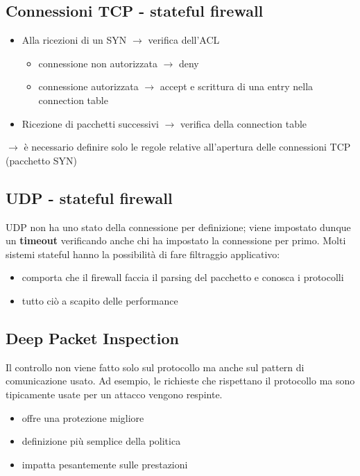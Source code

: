 \subsection{Connessioni TCP - stateful firewall}
\begin{itemize}
    \item Alla ricezioni di un SYN $\rightarrow$ verifica dell'ACL
    \begin{itemize}
        \item connessione non autorizzata $\rightarrow$ deny 
        \item connessione autorizzata $\rightarrow$ accept e scrittura di una entry nella connection table 
    \end{itemize}
    \item Ricezione di pacchetti successivi $\rightarrow$ verifica della connection table
\end{itemize}

\noindent $\rightarrow$ è necessario definire solo le regole relative all'apertura delle 
connessioni TCP (pacchetto SYN)

\subsection{UDP - stateful firewall}
UDP non ha uno stato della connessione per definizione; viene impostato dunque un \textbf{timeout}
verificando anche chi ha impostato la connessione per primo.
\noindent Molti sistemi stateful hanno la possibilità di fare filtraggio applicativo:
\begin{itemize}
    \item comporta che il firewall faccia il parsing del pacchetto e conosca i protocolli 
    \item tutto ciò a scapito delle performance
\end{itemize}

\subsection{Deep Packet Inspection}
Il controllo non viene fatto solo sul protocollo ma anche sul pattern di comunicazione usato. Ad 
esempio, le richieste che rispettano il protocollo ma sono tipicamente usate per un attacco vengono respinte.
\begin{itemize}
    \item offre una protezione migliore
    \item definizione più semplice della politica 
    \item impatta pesantemente sulle prestazioni
\end{itemize}



